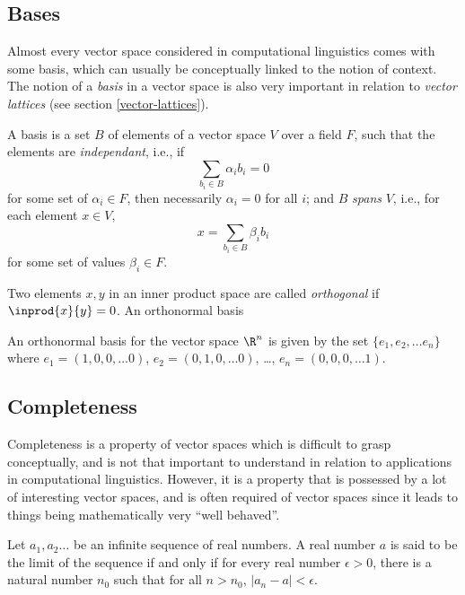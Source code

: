 \subsection{Bases}

Almost every vector space considered in computational linguistics comes with some basis, which can usually be conceptually linked to the notion of context. The notion of a \emph{basis} in a vector space is also very important in relation to \emph{vector lattices} (see section \ref{vector-lattices}).

\begin{defn}[Basis]
A basis is a set $B$ of elements of a vector space $V$ over a field $F$, such that the elements are \emph{independant}, i.e., if
$$\sum_{b_i \in B} \alpha_i b_i = 0$$
for some set of $\alpha_i \in F$, then necessarily $\alpha_i = 0$ for all $i$; and $B$ \emph{spans} $V$, i.e., for each element $x \in V$,
$$x = \sum_{b_i \in B} \beta_i b_i$$
for some set of values $\beta_i \in F$.

Two elements $x,y$ in an inner product space are called \emph{orthogonal} if $\inprod{x}{y} = 0$. An orthonormal basis
\end{defn}

\begin{example}
An orthonormal basis for the vector space $\R^n$ is given by the set $\{e_1,e_2,\ldots e_n\}$ where $e_1 = (1,0,0,\dots 0)$, $e_2 = (0,1,0,\dots 0)$, \ldots, $e_n = (0,0,0,\dots 1)$.
\end{example}

\subsection{Completeness}

Completeness is a property of vector spaces which is difficult to grasp conceptually, and is not that important to understand in relation to applications in computational linguistics. However, it is a property that is possessed by a lot of interesting vector spaces, and is often required of vector spaces since it leads to things being mathematically very ``well behaved''.

\begin{defn}[Limit]
Let $a_1,a_2\ldots$ be an infinite sequence of real numbers. A real number $a$ is said to be the limit of the sequence if and only if for every real number $\epsilon > 0$, there is a natural number $n_0$ such that for all $n > n_0$, $|a_n - a| < \epsilon$.
\end{defn}

